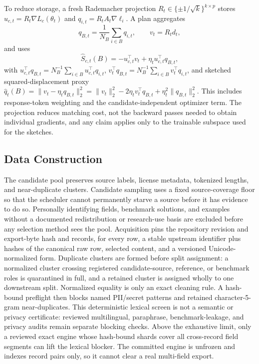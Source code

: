 \documentclass{article}
\begin{document}
To reduce storage, a fresh Rademacher projection
$R_t\in\{\pm1/\sqrt{k}\}^{k\times p}$ stores
$u_{c,t}=R_t\nabla L_c(\theta_t)$ and
$q_{i,t}=R_tA_t\nabla\ell_i$. A plan aggregates
\begin{equation}
q_{B,t}=\frac1{N_B}\sum_{i\in B}q_{i,t},\qquad v_t=R_td_t,
\end{equation}
and uses
\begin{equation}
\widehat S_{c,t}(B)=-u_{c,t}^\top v_t+
\eta_tu_{c,t}^\top q_{B,t},
\label{eq:sketch-score}
\end{equation}
with $u_{c,t}^\top q_{B,t}=N_B^{-1}\sum_{i\in B}u_{c,t}^\top q_{i,t}$,
$v_t^\top q_{B,t}=N_B^{-1}\sum_{i\in B}v_t^\top q_{i,t}$, and sketched
squared-displacement proxy
$\widehat q_t(B)=\|v_t-\eta_tq_{B,t}\|_2^2
=\|v_t\|_2^2-2\eta_tv_t^\top q_{B,t}+\eta_t^2\|q_{B,t}\|_2^2$.
This includes response-token weighting and the candidate-independent optimizer
term. The projection reduces matching cost, not the backward passes needed to
obtain individual gradients, and any claim applies
only to the trainable subspace used for the sketches.

\subsection{Data Construction}

The candidate pool preserves source labels, license metadata, tokenized
lengths, and near-duplicate clusters. Candidate sampling uses a fixed
source-coverage floor so that the scheduler cannot permanently starve a source
before it has evidence to do so. Personally identifying fields, benchmark
solutions, and examples without a documented redistribution or research-use
basis are excluded before any selection method sees the pool.
Acquisition pins the repository revision and export-byte hash and records, for
every row, a stable upstream identifier plus hashes of the canonical raw row,
selected content, and a versioned Unicode-normalized form. Duplicate clusters
are formed before split assignment: a normalized cluster crossing registered
candidate-source, reference, or benchmark roles is quarantined in full, and a
retained cluster is assigned wholly to one downstream split.
Normalized equality is only an exact cleaning rule. A hash-bound preflight
then blocks named PII/secret patterns and retained character-5-gram
near-duplicates. This deterministic lexical screen is not a semantic or privacy
certificate: reviewed multilingual, paraphrase, benchmark-leakage, and privacy
audits remain separate blocking checks. Above the exhaustive limit, only a
reviewed exact engine whose hash-bound shards cover all cross-record field
segments can lift the lexical blocker. The committed engine is unfrozen and
indexes record pairs only, so it cannot clear a real multi-field export.
\end{document}
